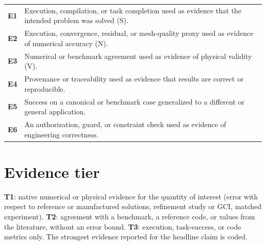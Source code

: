 \documentclass[10pt,a4paper]{article}
\begin{document}
\noindent\begin{tabularx}{\textwidth}{>{\bfseries}p{} L}
E1 & Execution, compilation, or task completion used as evidence that the intended problem was solved (S). \\
E2 & Execution, convergence, residual, or mesh-quality proxy used as evidence of numerical accuracy (N). \\
E3 & Numerical or benchmark agreement used as evidence of physical validity (V). \\
E4 & Provenance or traceability used as evidence that results are correct or reproducible. \\
E5 & Success on a canonical or benchmark case generalized to a different or general application. \\
E6 & An authorization, guard, or constraint check used as evidence of engineering correctness. \\
\end{tabularx}

\section{Evidence tier}
\textbf{T1}: native numerical or physical evidence for the quantity of interest (error with respect to reference or manufactured solutions, refinement study or GCI, matched experiment). \textbf{T2}: agreement with a benchmark, a reference code, or values from the literature, without an error bound. \textbf{T3}: execution, task-success, or code metrics only. The strongest evidence reported for the headline claim is coded.
\end{document}
